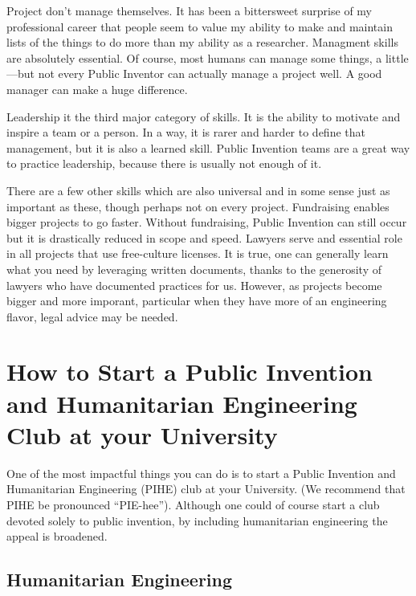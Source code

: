 \documentclass[
	fontsize=10pt, %
	twoside=false, %
	secnumdepth=1, %
]{kaobook}
\begin{document}
Project don't manage themselves. It has been a bittersweet surprise of my professional career that
people seem to value my ability to make and maintain lists of the things to do more than my ability
as a researcher. Managment skills are absolutely essential. Of course, most humans can manage
some things, a little---but not every Public Inventor can actually manage a project well. A good manager
can make a huge difference.

Leadership it the third major category of skills. It is the ability to motivate and inspire a team
or a person. In a way, it is rarer and harder to define that management, but it is also a learned
skill. Public Invention teams are a great way to practice leadership, because there is usually
not enough of it.

There are a few other skills which are also universal and in some sense just as important as these,
though perhaps not on every project. Fundraising enables bigger projects to go faster.
Without fundraising, Public Invention can still occur but it is drastically reduced in scope
and speed. Lawyers serve and essential role in all projects that use free-culture licenses.
It is true, one can generally learn what you need by leveraging written documents, thanks to the generosity of
lawyers who have documented practices for us. However, as projects become bigger and more imporant,
particular when they have more of an engineering flavor, legal advice may be needed.

\chapter{How to Start a Public Invention and Humanitarian Engineering Club at your University}

\label{sec:piheclub}


One of the most impactful things you can do is to start a Public Invention and Humanitarian Engineering (PIHE) club at your University. (We recommend that PIHE be pronounced “PIE-hee”). Although one could of course start a club devoted
solely to public invention, by including humanitarian engineering the appeal is broadened.



\section{Humanitarian Engineering}
\end{document}
